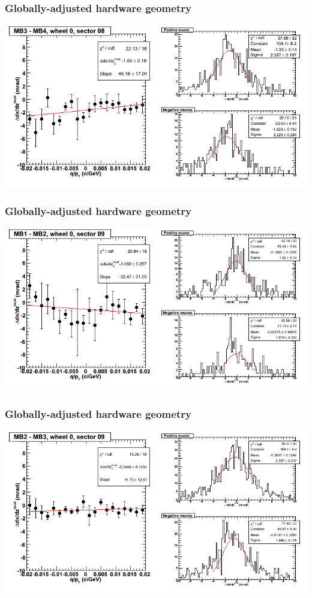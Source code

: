 \documentclass[compress]{beamer}
\begin{document}
\begin{frame}
\frametitle{Globally-adjusted hardware geometry}
\includegraphics[width=\linewidth]{NOV4_segdiffs_HW/dt13_slope_C_08_34.png}
\end{frame}

\begin{frame}
\frametitle{Globally-adjusted hardware geometry}
\includegraphics[width=\linewidth]{NOV4_segdiffs_HW/dt13_slope_C_09_12.png}
\end{frame}

\begin{frame}
\frametitle{Globally-adjusted hardware geometry}
\includegraphics[width=\linewidth]{NOV4_segdiffs_HW/dt13_slope_C_09_23.png}
\end{frame}
\end{document}
